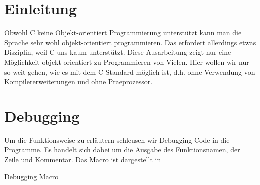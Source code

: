 \section{Einleitung}
Obwohl C keine Objekt-orientiert Programmierung unterstützt kann man die Sprache sehr wohl objekt-orientiert programmieren.
Das erfordert allerdings etwas Disziplin, weil C uns kaum unterstützt.
Diese Ausarbeitung zeigt nur eine Möglichkeit objekt-orientiert zu Programmieren von Vielen.
Hier wollen wir nur so weit gehen, wie es mit dem C-Standard möglich ist, d.h. ohne Verwendung von Kompilererweiterungen und ohne Praeprozessor.

\section{Debugging}
Um die Funktionsweise zu erläutern schleusen wir Debugging-Code in die Programme.
Es handelt sich dabei um die Ausgabe des Funktionsnamen, der Zeile und Kommentar.
Das Macro ist dargestellt in 

\begin{code}
	\caption{Debugging Macro}
	\label{code:debug}
	\inputminted{c}{code/employees_virt/debug.h}
\end{code}
